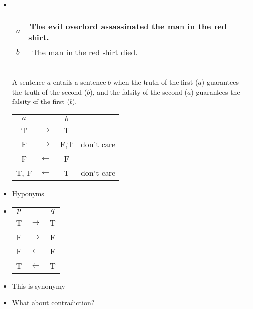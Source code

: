 \documentclass[headrule,footrule]{foils}
\begin{document}
\begin{itemize}
\item {} \\[2ex]
  \begin{tabular}{ll}
    $a$ & The evil overlord  assassinated the man in the red shirt. \\ \hline
    $b$ &  The man  in the red shirt died.
  \end{tabular}
  \\[2ex]
  A sentence $a$ entails a sentence $b$ when the truth of the first ($a$)
  guarantees the truth of the second ($b$), and the falsity of the
  second ($a$) guarantees the falsity of the first ($b$).
\begin{center}
  \begin{tabular}{|c|c|c|l}
    \cline{1-3}
    $a$ &  & $b$   \\
    \cline{1-3}
    T & $\rightarrow$  & T  \\ 
    F & $\rightarrow$  & F,T & don't care\\ 
    F & $\leftarrow$  & F  \\ 
    T, F & $\leftarrow$  & T  & don't care\\ 
    \cline{1-3}
  \end{tabular}
\end{center}
\end{itemize}

\begin{itemize}
\item Hyponyms
  \begin{exe}
    \ex {}
    \ex {}
  \end{exe}
\end{itemize}
\begin{itemize}
\item 
  \begin{exe}
    \ex {}
    \ex {}
  \end{exe}
\begin{center}
  \begin{tabular}{|c|c|c|}
    \cline{1-3}
    $p$ &  & $q$   \\
    \cline{1-3}
    T & $\rightarrow$  & T  \\ 
    F & $\rightarrow$  & F \\ 
    F & $\leftarrow$  & F  \\ 
    T & $\leftarrow$  & T  \\ 
    \cline{1-3}
  \end{tabular}
\end{center}
\item This is synonymy
\item What about contradiction?
\end{itemize}
\end{document}
